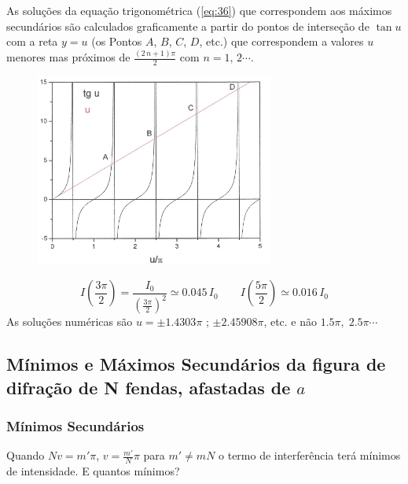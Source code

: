 \documentclass[a4paper,12pt]{article}
\begin{document}
As soluções da equação trigonométrica (\ref{eq:36}) que correspondem aos máximos secundários são calculados graficamente a partir do pontos de interseção de $\tan u$ com a reta $y=u$ (os Pontos $A$, $B$, $C$, $D$, etc.) que correspondem a valores $u$ menores mas próximos de $\frac{(2\,n +1)\pi}{2}$ com $n=1,\,2 \cdots$. 
\begin{figure}
	[htb] \label{fig:5} \centering 
	\includegraphics[width=0.7\textwidth]{figura5.png} \caption{ } 
\end{figure}
\begin{equation*}
	I(\frac{3\pi}{2}) =\frac{I_0}{(\frac{3\pi}{2})^2} \simeq 0.045 \, I_0 \qquad I(\frac{5\pi}{2}) \simeq 0.016 \, I_0 
\end{equation*}
As soluções numéricas são $u=\pm 1.4303\pi$ ; $\pm 2.45908\pi$, etc. e não $1.5\pi, \; 2.5\pi \cdots$ 

\subsection{Mínimos e Máximos Secundários da figura de difração de N fendas, afastadas de $a$}
\label{sec:maxminNfendas}
\subsubsection{Mínimos Secundários}

Quando $N v = m' \pi$, $v= \frac{m'}{N } \pi$ para $m' \ne m N$ o termo de interferência terá mínimos de intensidade.
E quantos mínimos?
   
\end{document}
